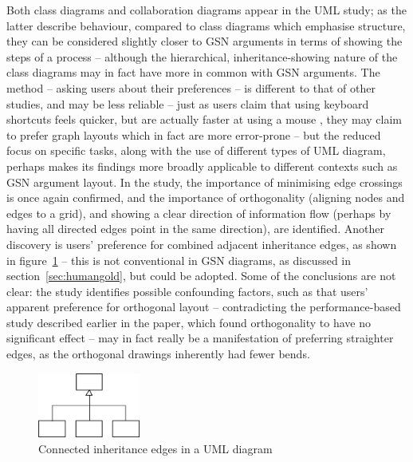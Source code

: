 Both class diagrams and collaboration diagrams appear in the UML study; as the latter describe behaviour, compared to class diagrams which emphasise structure, they can be considered slightly closer to GSN arguments in terms of showing the steps of a process -- although the hierarchical, inheritance-showing nature of the class diagrams may in fact have more in common with GSN arguments. The method -- asking users about their preferences -- is different to that of other studies, and may be less reliable -- just as users claim that using keyboard shortcuts feels quicker, but are actually faster at using a mouse \citep[pp.~26]{tognazzini1992tog}, they may claim to prefer graph layouts which in fact are more error-prone -- but the reduced focus on specific tasks, along with the use of different types of UML diagram, perhaps makes its findings more broadly applicable to different contexts such as GSN argument layout. In the study, the importance of minimising edge crossings is once again confirmed, and the importance of orthogonality (aligning nodes and edges to a grid), and showing a clear direction of information flow (perhaps by having all directed edges point in the same direction), are identified. Another discovery is users' preference for combined adjacent inheritance edges, as shown in figure~\ref{fig:connectededges} -- this is not conventional in GSN diagrams, as discussed in section~\ref{sec:humangold}, but could be adopted. Some of the conclusions are not clear: the study identifies possible confounding factors, such as that users' apparent preference for orthogonal layout -- contradicting the performance-based study described earlier in the paper, which found orthogonality to have no significant effect -- may in fact really be a manifestation of preferring straighter edges, as the orthogonal drawings inherently had fewer bends.

\begin{figure}
  \centering
  \includegraphics[width=0.3\textwidth]{graphics/connected-inheritance-edges.png}
  \caption{Connected inheritance edges in a UML diagram \cite{kennysun}}
  \label{fig:connectededges}
\end{figure}


